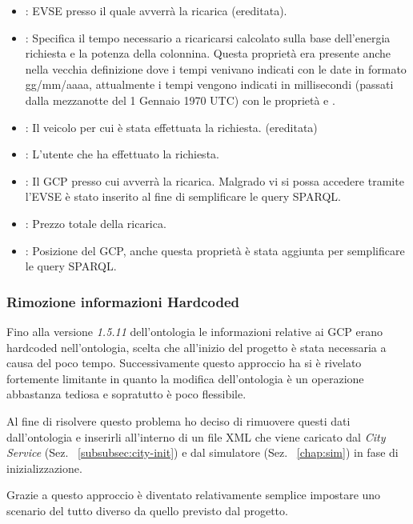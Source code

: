 \begin{itemize}
	\item {}: EVSE presso il quale avverrà la ricarica (ereditata).
	\item {}: Specifica il tempo necessario a ricaricarsi calcolato sulla base dell'energia richiesta e la potenza della colonnina. Questa proprietà era presente anche nella vecchia definizione dove i tempi venivano indicati con le date in formato gg/mm/aaaa, attualmente i tempi vengono indicati in millisecondi (passati dalla mezzanotte del 1 Gennaio 1970 UTC) con le proprietà  e .
	\item {}: Il veicolo per cui è stata effettuata la richiesta. (ereditata)
	\item {}: L'utente che ha effettuato la richiesta.
	\item {}: Il GCP presso cui avverrà la ricarica. Malgrado vi si possa accedere tramite l'EVSE è stato inserito al fine di semplificare le query SPARQL.
	\item {}: Prezzo totale della ricarica.
	\item {}: Posizione del GCP, anche questa proprietà è stata aggiunta per semplificare le query SPARQL.
\end{itemize}


\subsubsection{Rimozione informazioni Hardcoded}

Fino alla versione \emph{1.5.11} dell'ontologia le informazioni relative ai GCP erano hardcoded nell'ontologia, scelta che all'inizio del progetto è stata necessaria a causa del poco tempo. Successivamente questo approccio ha si è rivelato fortemente limitante in quanto la modifica dell'ontologia è un operazione abbastanza tediosa e sopratutto è poco flessibile. 

Al fine di risolvere questo problema ho deciso di rimuovere questi dati dall'ontologia e inserirli all'interno di un file XML che viene caricato dal \emph{City Service} (Sez. ~\ref{subsubsec:city-init}) e dal simulatore (Sez. ~\ref{chap:sim}) in fase di inizializzazione.

Grazie a questo approccio è diventato relativamente semplice impostare uno scenario del tutto diverso da quello previsto dal progetto.









